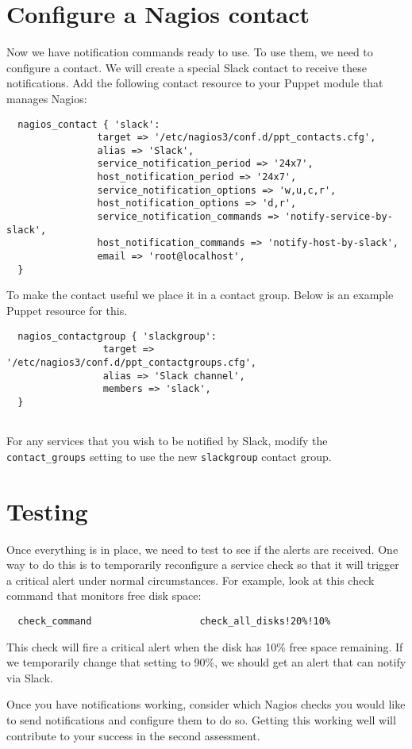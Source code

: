 \documentclass{article}   	%
\begin{document}
\begin{enumerate}
\section{Configure a Nagios contact}
Now we have notification commands ready to use. To use them, we need to configure a contact. We will create a special Slack contact to receive these notifications. Add the following contact resource to your Puppet module that manages Nagios:

\begin{verbatim}
  nagios_contact { 'slack':
                target => '/etc/nagios3/conf.d/ppt_contacts.cfg',
                alias => 'Slack',
                service_notification_period => '24x7',
                host_notification_period => '24x7',
                service_notification_options => 'w,u,c,r',
                host_notification_options => 'd,r',
                service_notification_commands => 'notify-service-by-slack',
                host_notification_commands => 'notify-host-by-slack',
                email => 'root@localhost',
  }
\end{verbatim}  

To make the contact useful we place it in a contact group. Below is an example Puppet resource for this.

\begin{verbatim}
  nagios_contactgroup { 'slackgroup':
                 target => '/etc/nagios3/conf.d/ppt_contactgroups.cfg',
                 alias => 'Slack channel',
                 members => 'slack', 
  }
  
 \end{verbatim} 

For any services that you wish to be notified by Slack, modify the \texttt{contact\_groups} setting to use the new \texttt{slackgroup} contact group.

\section{Testing}
Once everything is in place, we need to test to see if the alerts are received. One way to do this is to temporarily reconfigure a service check so that it will trigger a critical alert under normal circumstances. For example, look at this check command that monitors free disk space:

\begin{verbatim}
  check_command                   check_all_disks!20%!10%
\end{verbatim}

This check will fire a critical alert when the disk has 10\% free space remaining. If we temporarily change that setting to 90\%, we should get an alert that can notify via Slack.

Once you have notifications working, consider which Nagios checks you would like to send notifications and configure them to do so. Getting this working well will contribute to your success in the second assessment.

\end{enumerate}
\end{document}

